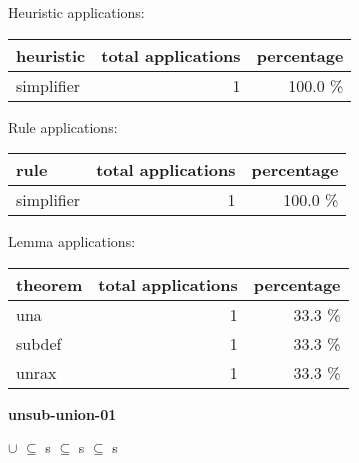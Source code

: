 \documentclass[a4paper]{article}
\begin{document}
\medskip


Heuristic applications:

\begin{supertabular}{l|r|r}
heuristic	& total applications & percentage \\ \hline
simplifier & 1 & 100.0 \% \\

\end{supertabular}

Rule applications:

\begin{supertabular}{l|r|r}
rule	        & total applications & percentage \\ \hline
simplifier & 1 & 100.0 \% \\

\end{supertabular}

Lemma applications:

\begin{supertabular}{l|r|r}
theorem	        & total applications & percentage \\ \hline
una & 1 & 33.3 \% \\
subdef & 1 & 33.3 \% \\
unrax & 1 & 33.3 \% \\

\end{supertabular}
\pagebreak

{\LARGE\bf unsub-union-01}\label{lemma-unsub-union-01}

\medskip

 \Fol {} $\cup$  $\subseteq$ s \Equiv {} $\subseteq$ s \And {} $\subseteq$ s
\end{document}

